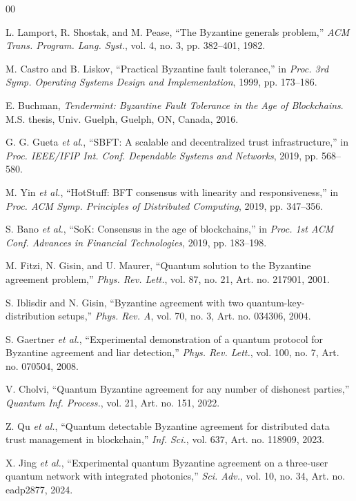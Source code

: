\documentclass{ieeeaccess}
\begin{document}
\begin{thebibliography}{00}

 L. Lamport, R. Shostak, and M. Pease, ``The Byzantine generals problem,'' \emph{ACM Trans. Program. Lang. Syst.}, vol. 4, no. 3, pp. 382--401, 1982.

 M. Castro and B. Liskov, ``Practical Byzantine fault tolerance,'' in \emph{Proc. 3rd Symp. Operating Systems Design and Implementation}, 1999, pp. 173--186.

 E. Buchman, \emph{Tendermint: Byzantine Fault Tolerance in the Age of Blockchains}. M.S. thesis, Univ. Guelph, Guelph, ON, Canada, 2016.

 G. G. Gueta \emph{et al.}, ``SBFT: A scalable and decentralized trust infrastructure,'' in \emph{Proc. IEEE/IFIP Int. Conf. Dependable Systems and Networks}, 2019, pp. 568--580.

 M. Yin \emph{et al.}, ``HotStuff: BFT consensus with linearity and responsiveness,'' in \emph{Proc. ACM Symp. Principles of Distributed Computing}, 2019, pp. 347--356.

 S. Bano \emph{et al.}, ``SoK: Consensus in the age of blockchains,'' in \emph{Proc. 1st ACM Conf. Advances in Financial Technologies}, 2019, pp. 183--198.

 M. Fitzi, N. Gisin, and U. Maurer, ``Quantum solution to the Byzantine agreement problem,'' \emph{Phys. Rev. Lett.}, vol. 87, no. 21, Art. no. 217901, 2001.

 S. Iblisdir and N. Gisin, ``Byzantine agreement with two quantum-key-distribution setups,'' \emph{Phys. Rev. A}, vol. 70, no. 3, Art. no. 034306, 2004.

 S. Gaertner \emph{et al.}, ``Experimental demonstration of a quantum protocol for Byzantine agreement and liar detection,'' \emph{Phys. Rev. Lett.}, vol. 100, no. 7, Art. no. 070504, 2008.

 V. Cholvi, ``Quantum Byzantine agreement for any number of dishonest parties,'' \emph{Quantum Inf. Process.}, vol. 21, Art. no. 151, 2022.

 Z. Qu \emph{et al.}, ``Quantum detectable Byzantine agreement for distributed data trust management in blockchain,'' \emph{Inf. Sci.}, vol. 637, Art. no. 118909, 2023.

 X. Jing \emph{et al.}, ``Experimental quantum Byzantine agreement on a three-user quantum network with integrated photonics,'' \emph{Sci. Adv.}, vol. 10, no. 34, Art. no. eadp2877, 2024.


\end{thebibliography}
\end{document}
